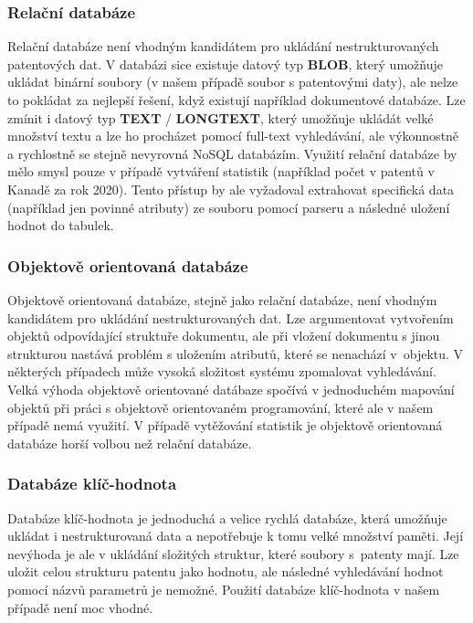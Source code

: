 \subsubsection{Relační databáze}
Relační databáze není vhodným kandidátem pro ukládání nestrukturovaných patentových dat. V databázi sice existuje datový typ \textbf{BLOB}, který umožňuje ukládat binární soubory (v našem případě soubor s patentovými daty), ale nelze to pokládat za nejlepší řešení, když existují například dokumentové databáze. Lze zmínit i datový typ \textbf{TEXT} / \textbf{LONGTEXT}, který umožňuje ukládát velké množství textu a lze ho procházet pomocí full-text vyhledávání, ale výkonnostně a rychlostně se stejně nevyrovná NoSQL databázím. 
\newline
\indent Využití relační databáze by mělo smysl pouze v případě vytváření statistik (například počet v patentů v Kanadě za rok 2020). Tento přístup by ale vyžadoval extrahovat specifická data (například jen povinné atributy) ze souboru pomocí parseru a následné uložení hodnot do tabulek. 

\subsubsection{Objektově orientovaná databáze}
Objektově orientovaná databáze, stejně jako relační databáze, není vhodným kandidátem pro ukládání nestrukturovaných dat. Lze argumentovat vytvořením objektů odpovídající struktuře dokumentu, ale při vložení dokumentu s jinou strukturou nastává problém s uložením atributů, které se nenachází v~objektu. V některých případech může vysoká složitost systému zpomalovat vyhledávání. Velká výhoda objektově orientované datábaze spočívá v jednoduchém mapování objektů při práci s objektově orientovaném programování, které ale v našem případě nemá využití. V případě vytěžování statistik je objektově orientovaná databáze horší volbou než relační databáze.

\subsubsection{Databáze klíč-hodnota}
Databáze klíč-hodnota je jednoduchá a velice rychlá databáze, která umožňuje ukládat i nestrukturovaná data a nepotřebuje k tomu velké množství paměti. Její nevýhoda je ale v ukládání složitých struktur, které soubory s~patenty mají. Lze uložit celou strukturu patentu jako hodnotu, ale následné vyhledávání hodnot pomocí názvů parametrů je nemožné. Použití databáze klíč-hodnota v našem případě není moc vhodné.

